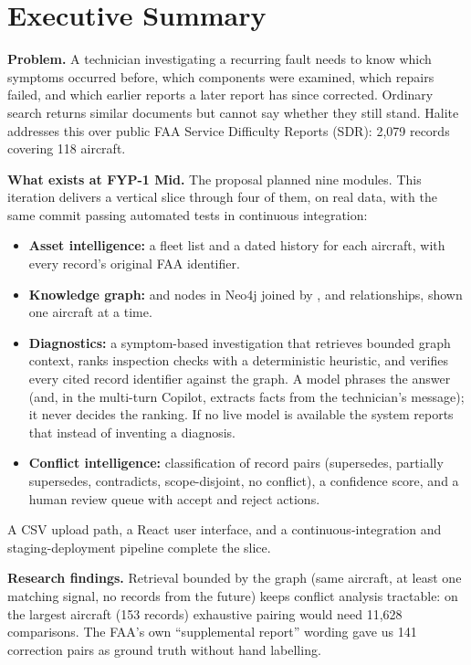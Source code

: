 \chapter*{Executive Summary}

\textbf{Problem.} A technician investigating a recurring fault needs to know which symptoms occurred before, which components were examined, which repairs failed, and which earlier reports a later report has since corrected. Ordinary search returns similar documents but cannot say whether they still stand. Halite addresses this over public FAA Service Difficulty Reports (SDR): 2,079 records covering 118 aircraft.

\textbf{What exists at FYP-1 Mid.} The proposal planned nine modules. This iteration delivers a vertical slice through four of them, on real data, with the same commit passing automated tests in continuous integration:
\begin{itemize}
\item \textbf{Asset intelligence:} a fleet list and a dated history for each aircraft, with every record's original FAA identifier.
\item \textbf{Knowledge graph:}  and  nodes in Neo4j joined by ,  and  relationships, shown one aircraft at a time.
\item \textbf{Diagnostics:} a symptom-based investigation that retrieves bounded graph context, ranks inspection checks with a deterministic heuristic, and verifies every cited record identifier against the graph. A model phrases the answer (and, in the multi-turn Copilot, extracts facts from the technician's message); it never decides the ranking. If no live model is available the system reports that instead of inventing a diagnosis.
\item \textbf{Conflict intelligence:} classification of record pairs (supersedes, partially supersedes, contradicts, scope-disjoint, no conflict), a confidence score, and a human review queue with accept and reject actions.
\end{itemize}
A CSV upload path, a React user interface, and a continuous-integration and staging-deployment pipeline complete the slice.

\textbf{Research findings.} Retrieval bounded by the graph (same aircraft, at least one matching signal, no records from the future) keeps conflict analysis tractable: on the largest aircraft (153 records) exhaustive pairing would need 11,628 comparisons. The FAA's own ``supplemental report'' wording gave us 141 correction pairs as ground truth without hand labelling.

